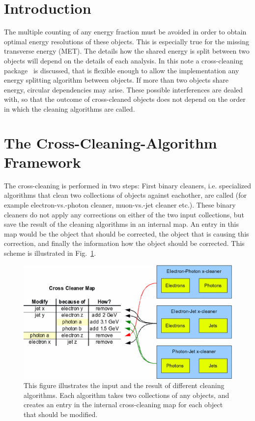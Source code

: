 \documentclass{cmspaper}
\begin{document}
\section{Introduction}
The multiple counting of any energy fraction must be
avoided in order to obtain optimal energy resolutions of these objects. This is
especially true for the missing transverse energy (MET). The details how the
shared energy is split between two objects will depend on the details of each
analysis. In this note a cross-cleaning package~\cite{package} is discussed,
that is flexible enough to allow the implementation any energy splitting
algorithm between objects. If more than two objects share energy, circular
dependencies may arise. These possible interferences are dealed with, so that
the outcome of cross-cleaned objects does not depend on the order in which the
cleaning algorithms are called.


\section{The Cross-Cleaning-Algorithm Framework}
The cross-cleaning is performed in two steps: First binary cleaners, i.e.
specialized algorithms that clean two collections of objects against eachother,
are called (for example electron-vs.-photon cleaner, muon-vs.-jet cleaner etc.).
These binary cleaners do not apply any corrections on either of the two input
collections, but save the result of the cleaning algorithms in an internal map.
An entry in this map would be the object that should be corrected, the object
that is causing this correction, and finally the information how the object
should be corrected. This scheme is illustrated in Fig.~\ref{fig:Cleaning}.

\begin{figure}[hbtp]
  \begin{center}
    \includegraphics[scale=.4]{CleaningMap.eps}
    \caption{This figure illustrates the input and the result of different
    cleaning algorithms. Each algorithm takes two collections of any objects,
    and creates an entry in the internal cross-cleaning map for each object that
    should be modified.}
    \label{fig:Cleaning}
  \end{center}
\end{figure}
\end{document}
